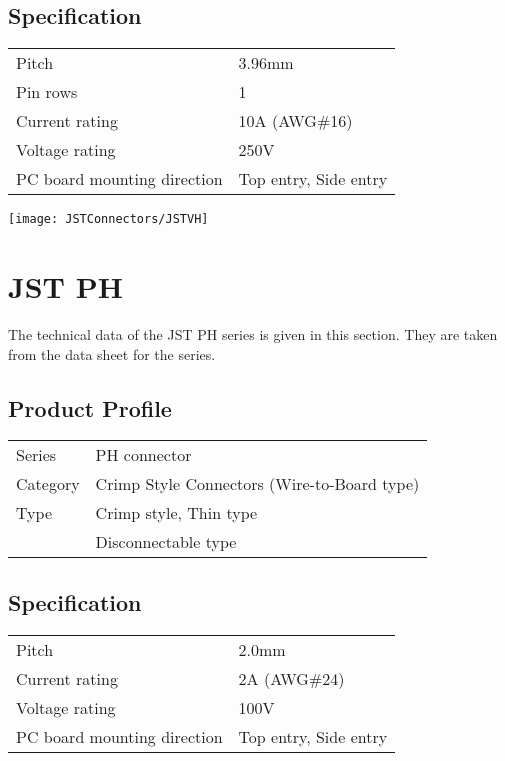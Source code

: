 \subsection{Specification}

\begin{tabular}{ll}
  Pitch          & 3.96mm \\
  Pin rows       & 1 \\
  Current rating & 10A (AWG\#16) \\
  Voltage rating & 250V\\
  PC board mounting direction & Top entry, Side entry  
\end{tabular}  


\begin{center}
    \texttt{[image: JSTConnectors/JSTVH]}
\end{center}


\section{JST PH}

The technical data of the JST PH series is given in this section. They are taken from the data sheet for the series. \cite{JST:2022}

\subsection{Product Profile}

\begin{tabular}{ll}
  Series   & PH connector \\
  Category & Crimp Style Connectors (Wire-to-Board type)\\
  Type     & Crimp style, Thin type \\
           & Disconnectable type \\
\end{tabular}

\subsection{Specification}

\begin{tabular}{ll}
  Pitch  & 2.0mm  \\
  Current rating & 2A (AWG\#24) \\
  Voltage rating & 100V \\
  PC board mounting direction & Top entry, Side entry \\
\end{tabular}

